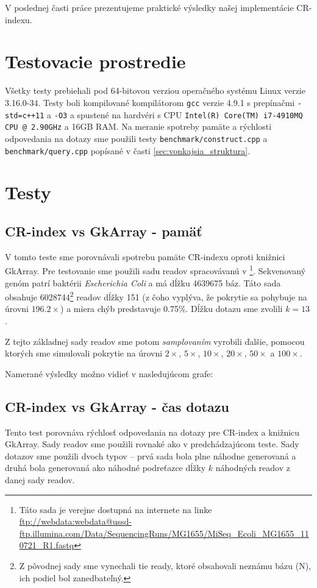 V poslednej časti práce prezentujeme praktické výsledky našej implementácie CR-indexu.

\section{Testovacie prostredie}
Všetky testy prebiehali pod 64-bitovou verziou operačného systému Linux verzie 3.16.0-34. Testy boli kompilované kompilátorom \texttt{gcc} verzie 4.9.1 s prepínačmi \texttt{-std=c++11} a \texttt{-O3} a spustené na hardvéri s CPU \texttt{Intel(R) Core(TM) i7-4910MQ CPU @ 2.90GHz} a 16GB RAM. Na meranie spotreby pamäte a rýchlosti odpovedania na dotazy sme použili testy \texttt{benchmark/construct.cpp} a \texttt{benchmark/query.cpp} popísané v časti \ref{sec:vonkajsia_struktura}.

\section{Testy}

\subsection{CR-index vs GkArray - pamäť}
V tomto teste sme porovnávali spotrebu pamäte CR-indexu oproti knižnici GkArray. Pre testovanie sme použili sadu readov spracovávanú v \cite{DFPB13}\footnote{Táto sada je verejne dostupná na internete na linke \url{ftp://webdata:webdata@ussd-ftp.illumina.com/Data/SequencingRuns/MG1655/MiSeq_Ecoli_MG1655_110721_R1.fastq}}. Sekvenovaný genóm patrí baktérii \emph{Escherichia Coli} a má dĺžku 4639675 báz. Táto sada obsahuje 6028744\footnote{Z pôvodnej sady sme vynechali tie ready, ktoré obsahovali neznámu bázu (N), ich podiel bol zanedbateľný.} readov dĺžky 151 (z čoho vyplýva, že pokrytie sa pohybuje na úrovni $196.2\times$) a miera chýb predstavuje 0.75\%. Dĺžku dotazu sme zvolili $k=13$.

Z tejto základnej sady readov sme potom \emph{samplovaním} vyrobili ďalšie, pomocou ktorých sme simulovali pokrytie na úrovni $2\times$, $5\times$, $10\times$, $20\times$, $50\times$ a $100\times$.

Namerané výsledky možno vidieť v nasledujúcom grafe:




\subsection{CR-index vs GkArray - čas dotazu}
Tento test porovnáva rýchlosť odpovedania na dotazy pre CR-index a knižnicu GkArray. Sady readov sme použili rovnaké ako v predchádzajúcom teste. Sady dotazov sme použili dvoch typov -- prvá sada bola plne náhodne generovaná a druhá bola generovaná ako náhodné podreťazce dĺžky $k$ náhodných readov z danej sady readov.

